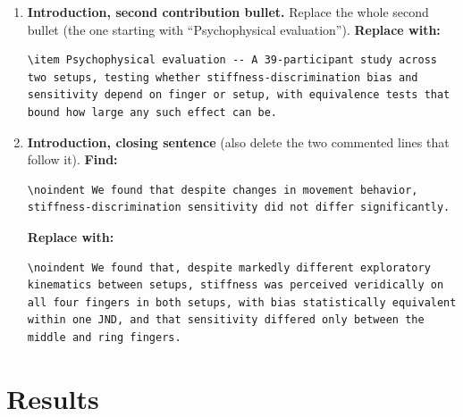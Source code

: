 \documentclass[11pt,a4paper]{article}
\newcommand{\replace}{\noindent\textbf{Replace with:}\par\nopagebreak}
\begin{document}
\begin{enumerate}
\item \textbf{Introduction, second contribution bullet.} Replace the whole second bullet (the one starting with ``Psychophysical evaluation'').
\replace
\begin{lstlisting}
\item Psychophysical evaluation -- A 39-participant study across two setups, testing whether stiffness-discrimination bias and sensitivity depend on finger or setup, with equivalence tests that bound how large any such effect can be.
\end{lstlisting}

\item \textbf{Introduction, closing sentence} (also delete the two commented lines that follow it).
\noindent\textbf{Find:}\begin{lstlisting}
\noindent We found that despite changes in movement behavior, stiffness-discrimination sensitivity did not differ significantly.
\end{lstlisting}
\replace
\begin{lstlisting}
\noindent We found that, despite markedly different exploratory kinematics between setups, stiffness was perceived veridically on all four fingers in both setups, with bias statistically equivalent within one JND, and that sensitivity differed only between the middle and ring fingers.
\end{lstlisting}
\end{enumerate}

\section*{Results}
\end{document}
